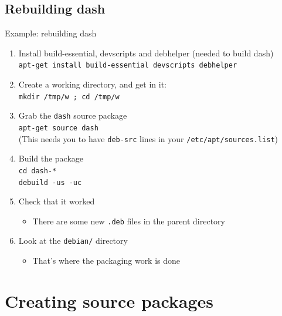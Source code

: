 \documentclass[10pt,final]{beamer}
\begin{document}
\subsection{Rebuilding dash}
\begin{frame}{Example: rebuilding dash}
\begin{enumerate}
\item Install build-essential, devscripts and debhelper (needed to build dash)\\
  {\texttt{apt-get install build-essential devscripts debhelper}}
  \hbr
\item Create a working directory, and get in it:\\
 \texttt{mkdir /tmp/w ; cd /tmp/w}
  \hbr
\item Grab the \texttt{dash} source package\\
  \texttt{apt-get source dash}\\ 
  {\small (This needs you to have \texttt{deb-src} lines in your \texttt{/etc/apt/sources.list})}
  \hbr
\item Build the package\\
  {\texttt{cd dash-*\\ debuild -us -uc}}

  \hbr
\item Check that it worked
	\begin{itemize}
		\item  There are some new \texttt{.deb} files in the parent directory
	\end{itemize}
    \hbr
\item Look at the \texttt{debian/} directory
	\begin{itemize}
		\item That's where the packaging work is done
	\end{itemize}
\end{enumerate}
\end{frame}

\section{Creating source packages}
\end{document}
